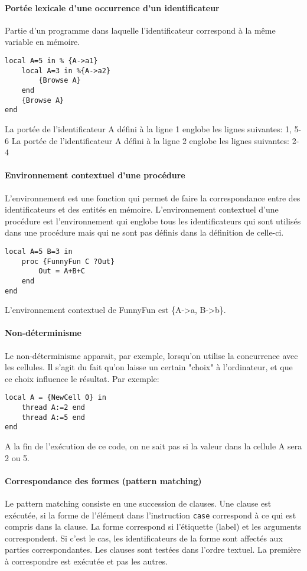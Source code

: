 \paragraph{Portée lexicale d'une occurrence d'un identificateur}
Partie d'un programme dans laquelle l'identificateur correspond à la même variable en mémoire.
\begin{lstlisting}
local A=5 in % {A->a1}
	local A=3 in %{A->a2}
		{Browse A}
	end
	{Browse A}
end
\end{lstlisting}
La portée de l'identificateur A défini à la ligne 1 englobe les lignes suivantes: 1, 5-6
La portée de l'identificateur A défini à la ligne 2 englobe les lignes suivantes: 2-4



\paragraph{Environnement contextuel d'une procédure}
L'environnement est une fonction qui permet de faire la correspondance entre des identificateurs et des entités en mémoire. 
L'environnement contextuel d'une procédure est l'environnement qui englobe tous les identificateurs qui sont utilisés dans une procédure mais qui ne sont pas définis dans la définition de celle-ci.

\begin{lstlisting}
local A=5 B=3 in
	proc {FunnyFun C ?Out}
		Out = A+B+C
	end
end
\end{lstlisting}

L'environnement contextuel de FunnyFun est \{A->a, B->b\}.

\paragraph{Non-déterminisme}
Le non-déterminisme apparait, par exemple, lorsqu'on utilise la concurrence avec les cellules. Il s'agit du fait qu'on laisse un certain "choix" à l'ordinateur, et que ce choix influence le résultat. Par exemple:
\begin{lstlisting}
local A = {NewCell 0} in
	thread A:=2 end
	thread A:=5 end
end
\end{lstlisting}

A la fin de l'exécution de ce code, on ne sait pas si la valeur dans la cellule A sera 2 ou 5.


\paragraph{Correspondance des formes (pattern matching)} Le pattern matching consiste en une succession de clauses.
Une clause est exécutée, si la forme de l'élément dans l'instruction \lstinline|case| correspond à ce qui est compris dans la clause.
La forme correspond si l'étiquette (label) et les arguments correspondent. Si c'est le cas, les identificateurs de la forme sont affectés aux parties correspondantes. Les clauses sont testées dans l'ordre textuel.
La première à correspondre est exécutée et pas les autres.


